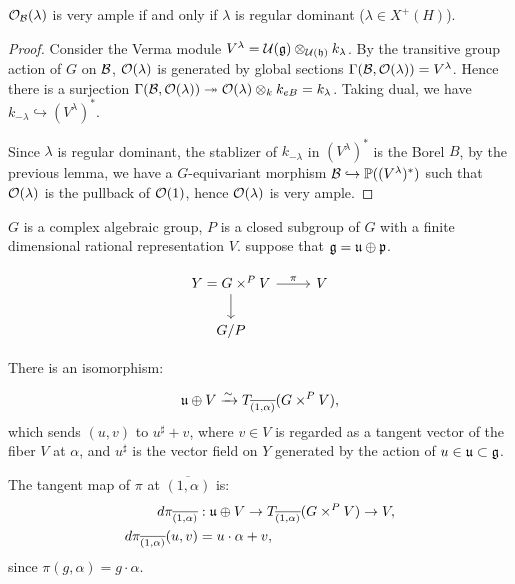 \begin{lem}
  $\mathcal{O}_{\mathcal{B}}(\lambda)$ is very ample if and only if $\lambda$ is regular dominant ($\lambda \in X^+(H)$).
\end{lem}

\begin{proof}
  Consider the Verma module $V^{\lambda} = \mathcal{U}(\mathfrak{g}) \otimes_{\mathcal{U}(\mathfrak{h})} k_{\lambda}$. By the transitive group action of $G$ on $\mathcal{B}$, $\mathcal{O}(\lambda)$ is generated by global sections $\Gamma(\mathcal{B},\mathcal{O}(\lambda)) = V^{\lambda}$. Hence there is a surjection $\Gamma(\mathcal{B},\mathcal{O}(\lambda)) \twoheadrightarrow \mathcal{O}(\lambda) \otimes_k k_{eB} = k_{\lambda}$. Taking dual, we have $k_{-\lambda} \hookrightarrow (V^{\lambda})^*$.

  Since $\lambda$ is regular dominant, the stablizer of $k_{-\lambda}$ in $(V^{\lambda})^*$ is the Borel $B$, by the previous lemma, we have a $G$-equivariant morphism $\mathcal{B} \hookrightarrow \mathbb{P}((V^{\lambda})^*)$ such that $\mathcal{O}(\lambda)$ is the pullback of $\mathcal{O}(1)$, hence $\mathcal{O}(\lambda)$ is very ample.
\end{proof}





$G$ is a complex algebraic group, $P$ is a closed subgroup of $G$ with a finite dimensional rational representation $V$. suppose that $\mathfrak{g} = \mathfrak{u} \oplus \mathfrak{p}$.

\[
  \begin{tikzcd}
    Y = G \times^P V \arrow[r, "\pi"] \arrow[d] & V \\
    G/P &
  \end{tikzcd}
\]

There is an isomorphism:

\[
  \mathfrak{u} \oplus V \xrightarrow{\sim} T_{\overline{(1,\alpha)}}(G \times^P V)  ,
\]
which sends $(u,v)$ to $u^{\sharp} + v$, where $v \in V$ is regarded as a tangent vector of the fiber $V$ at $\alpha$, and $u^{\sharp}$ is the vector field on $Y$ generated by the action of $u \in \mathfrak{u} \subset \mathfrak{g}$.

The tangent map of $\pi$ at $\overline{(1,\alpha)}$ is:
\begin{align*}
  d \pi_{\overline{(1,\alpha)}} &: \mathfrak{u} \oplus V \to T_{\overline{(1,\alpha)}}(G \times^P V) \to V, \\
  d\pi_{\overline{(1,\alpha)}}(u,v) &= u \cdot \alpha + v,
\end{align*}
since $\pi(g,\alpha) = g \cdot \alpha$.

